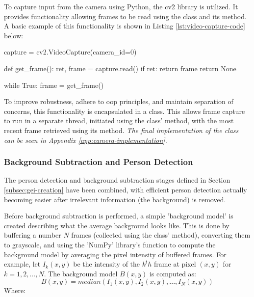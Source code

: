 To capture input from the camera using Python, the \ac{cv2} library is utilized. It provides functionality allowing frames to be read using the  class and its  method.
A basic example of this functionality is shown in Listing \ref{lst:video-capture-code} below:

\begin{code}
capture = cv2.VideoCapture(camera_id=0)

def get_frame():
	ret, frame = capture.read()
	if ret:
		return frame
	return None

while True:
	frame = get_frame()
\end{code}
\label{lst:video-capture-code} \vspace{10pt}

To improve robustness, adhere to \ac{oop} principles, and maintain separation of concerns, this functionality is encapsulated in a  class.
This allows frame capture to run in a separate thread, initiated using the class'  method, with the most recent frame retrieved using its  method. \textit{The final implementation of the  class can be seen in Appendix \ref{app:camera-implementation}.}


\subsubsection{Background Subtraction and Person Detection}
\label{subsec:background-subtraction-and-person-detection}

The person detection and background subtraction stages defined in Section \ref{subsec:gei-creation} have been combined, with efficient person detection actually becoming easier after irrelevant information (the background) is removed.

Before background subtraction is performed, a simple 'background model' is created describing what the average background looks like.
This is done by buffering a number $N$ frames (collected using the  class'  method), converting them to grayscale, and using the 'NumPy' library's  function to compute the background model by averaging the pixel intensity of buffered frames.
For example, let $I_k(x,y)$ be the intensity of the $k^th$ frame at pixel $(x,y)$ for $k=1,2,...,N$. The background model $B(x,y)$ is computed as: \[ B(x,y) = median(I_1(x,y),I_2(x,y),...,I_N(x,y))\] Where:

